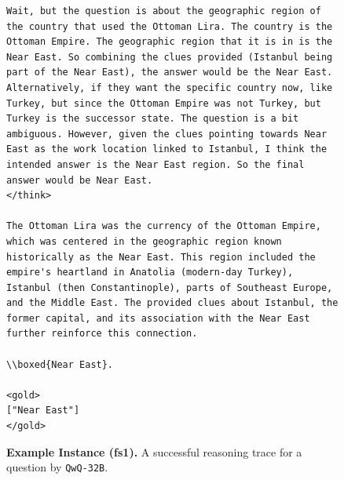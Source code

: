 \documentclass[11pt]{article}
\newcommand{\qwq}{\texttt{QwQ-32B}}
\begin{document}
\begin{figure}[t]
\begin{tcolorbox}[title=QwQ-32B Example (\textbf{fs1}), promptstyle]
\begin{lstlisting}[linewidth=\linewidth]
Wait, but the question is about the geographic region of the country that used the Ottoman Lira. The country is the Ottoman Empire. The geographic region that it is in is the Near East. So combining the clues provided (Istanbul being part of the Near East), the answer would be the Near East. Alternatively, if they want the specific country now, like Turkey, but since the Ottoman Empire was not Turkey, but Turkey is the successor state. The question is a bit ambiguous. However, given the clues pointing towards Near East as the work location linked to Istanbul, I think the intended answer is the Near East region. So the final answer would be Near East.
</think>

The Ottoman Lira was the currency of the Ottoman Empire, which was centered in the geographic region known historically as the Near East. This region included the empire's heartland in Anatolia (modern-day Turkey), Istanbul (then Constantinople), parts of Southeast Europe, and the Middle East. The provided clues about Istanbul, the former capital, and its association with the Near East further reinforce this connection. 

\\boxed{Near East}.

<gold>
["Near East"]
</gold>
\end{lstlisting}
\end{tcolorbox}
    \caption{\textbf{Example Instance (fs1).} A successful reasoning trace for a question by \qwq{}.}
    \label{fig:ex-reasoning-trace-fs1-qwq}
\end{figure}
\end{document}
